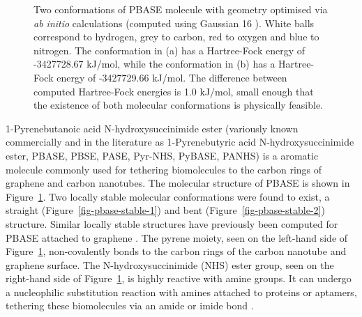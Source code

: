 \documentclass[
  a4paper,
]{scrbook}
\begin{document}
\begin{figure}
\begin{minipage}[t]{0.47\linewidth}
{\centering 


}

\subcaption{\label{fig-pbase-stable-2}}
\end{minipage}%

\caption{\label{fig-pbase-structure}Two conformations of PBASE molecule
with geometry optimised via \emph{ab initio} calculations (computed
using Gaussian 16 \autocite{g16}). White balls correspond to hydrogen,
grey to carbon, red to oxygen and blue to nitrogen. The conformation in
(a) has a Hartree-Fock energy of -3427728.67 kJ/mol, while the
conformation in (b) has a Hartree-Fock energy of -3427729.66 kJ/mol. The
difference between computed Hartree-Fock energies is 1.0 kJ/mol, small
enough that the existence of both molecular conformations is physically
feasible.}

\end{figure}

1-Pyrenebutanoic acid N-hydroxysuccinimide ester (variously known
commercially and in the literature as 1-Pyrenebutyric acid
N-hydroxysuccinimide ester, PBASE, PBSE, PASE, Pyr-NHS, PyBASE, PANHS)
is a aromatic molecule commonly used for tethering biomolecules to the
carbon rings of graphene and carbon nanotubes. The molecular structure
of PBASE is shown in Figure~\ref{fig-pbase-structure}. Two locally
stable molecular conformations were found to exist, a straight
(Figure~\ref{fig-pbase-stable-1}) and bent
(Figure~\ref{fig-pbase-stable-2}) structure. Similar locally stable
structures have previously been computed for PBASE attached to graphene
\autocite{Oishi2022}. The pyrene moiety, seen on the left-hand side of
Figure~\ref{fig-pbase-structure}, non-covalently bonds to the carbon
rings of the carbon nanotube and graphene surface. The
N-hydroxysuccinimide (NHS) ester group, seen on the right-hand side of
Figure~\ref{fig-pbase-structure}, is highly reactive with amine groups.
It can undergo a nucleophilic substitution reaction with amines attached
to proteins or aptamers, tethering these biomolecules via an amide or
imide bond
\autocite{Chen2001,Hermanson2013-16,Hermanson2013-3,Mishyn2022}.
\end{document}
